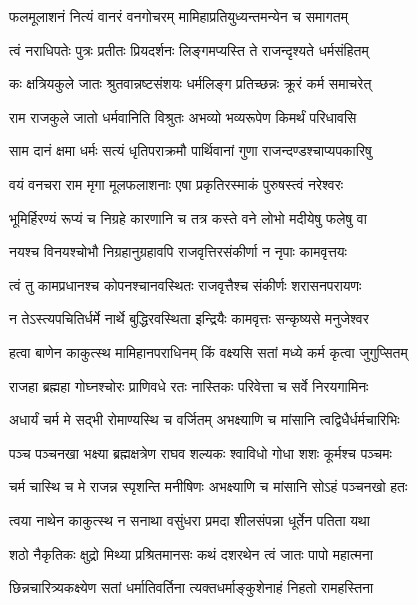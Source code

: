 \twolineshloka
{फलमूलाशनं नित्यं वानरं वनगोचरम्}
{मामिहाप्रतियुध्यन्तमन्येन च समागतम्} %

\twolineshloka
{त्वं नराधिपतेः पुत्रः प्रतीतः प्रियदर्शनः}
{लिङ्गमप्यस्ति ते राजन्दृश्यते धर्मसंहितम्} %

\twolineshloka
{कः क्षत्रियकुले जातः श्रुतवान्नष्टसंशयः}
{धर्मलिङ्ग प्रतिच्छन्नः क्रूरं कर्म समाचरेत्} %

\twolineshloka
{राम राजकुले जातो धर्मवानिति विश्रुतः}
{अभव्यो भव्यरूपेण किमर्थं परिधावसि} %

\twolineshloka
{साम दानं क्षमा धर्मः सत्यं धृतिपराक्रमौ}
{पार्थिवानां गुणा राजन्दण्डश्चाप्यपकारिषु} %

\twolineshloka
{वयं वनचरा राम मृगा मूलफलाशनाः}
{एषा प्रकृतिरस्माकं पुरुषस्त्वं नरेश्वरः} %

\twolineshloka
{भूमिर्हिरण्यं रूप्यं च निग्रहे कारणानि च}
{तत्र कस्ते वने लोभो मदीयेषु फलेषु वा} %

\twolineshloka
{नयश्च विनयश्चोभौ निग्रहानुग्रहावपि}
{राजवृत्तिरसंकीर्णा न नृपाः कामवृत्तयः} %

\twolineshloka
{त्वं तु कामप्रधानश्च कोपनश्चानवस्थितः}
{राजवृत्तैश्च संकीर्णः शरासनपरायणः} %

\twolineshloka
{न तेऽस्त्यपचितिर्धर्मे नार्थे बुद्धिरवस्थिता}
{इन्द्रियैः कामवृत्तः सन्कृष्यसे मनुजेश्वर} %

\twolineshloka
{हत्वा बाणेन काकुत्स्थ मामिहानपराधिनम्}
{किं वक्ष्यसि सतां मध्ये कर्म कृत्वा जुगुप्सितम्} %

\twolineshloka
{राजहा ब्रह्महा गोघ्नश्चोरः प्राणिवधे रतः}
{नास्तिकः परिवेत्ता च सर्वे निरयगामिनः} %

\twolineshloka
{अधार्यं चर्म मे सद्भी रोमाण्यस्थि च वर्जितम्}
{अभक्ष्याणि च मांसानि त्वद्विधैर्धर्मचारिभिः} %

\twolineshloka
{पञ्च पञ्चनखा भक्ष्या ब्रह्मक्षत्रेण राघव}
{शल्यकः श्वाविधो गोधा शशः कूर्मश्च पञ्चमः} %

\twolineshloka
{चर्म चास्थि च मे राजन्न स्पृशन्ति मनीषिणः}
{अभक्ष्याणि च मांसानि सोऽहं पञ्चनखो हतः} %

\twolineshloka
{त्वया नाथेन काकुत्स्थ न सनाथा वसुंधरा}
{प्रमदा शीलसंपन्ना धूर्तेन पतिता यथा} %

\twolineshloka
{शठो नैकृतिकः क्षुद्रो मिथ्या प्रश्रितमानसः}
{कथं दशरथेन त्वं जातः पापो महात्मना} %

\twolineshloka
{छिन्नचारित्र्यकक्ष्येण सतां धर्मातिवर्तिना}
{त्यक्तधर्माङ्कुशेनाहं निहतो रामहस्तिना} %

